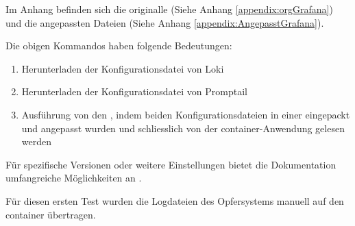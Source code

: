 
Im Anhang befinden sich die originalle (Siehe Anhang \ref{appendix:orgGrafana}) und die angepassten Dateien (Siehe Anhang \ref{appendix:AngepasstGrafana}).

Die obigen Kommandos haben folgende Bedeutungen:
\begin{enumerate}[noitemsep]
   \item Herunterladen der Konfigurationsdatei von Loki
   \item Herunterladen der Konfigurationsdatei von Promptail
   \item Ausführung von den , indem beiden Konfigurationsdateien in einer eingepackt und angepasst wurden und schliesslich von der \gls{container}-Anwendung gelesen werden
\end{enumerate}

Für spezifische Versionen oder weitere Einstellungen bietet die Dokumentation umfangreiche Möglichkeiten an \citep{GrafanaLoki_run}.

Für diesen ersten Test wurden die Logdateien des Opfersystems manuell auf den \gls{container} übertragen.

